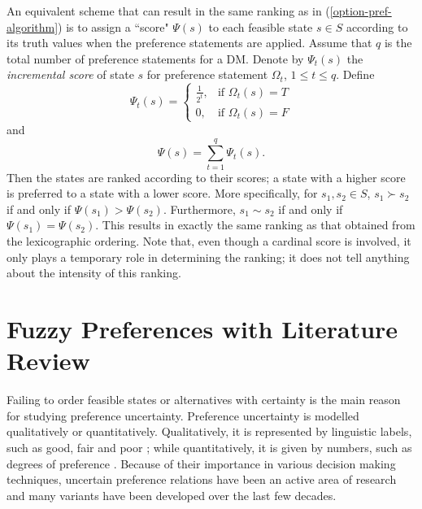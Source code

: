 An equivalent scheme that can result in the same ranking as in (\ref{option-pref-algorithm}) is to assign a ``score" $\Psi(s)$ to each feasible state $s \in S$ according to its truth values when the preference statements are applied. Assume that $q$ is the total number of preference statements for a DM. Denote by $\Psi_t(s)$ the \emph{incremental score} of state $s$ for preference statement $\Omega_t$, $1 \leq t \leq q$. Define
$$\Psi_t(s)=\left\{ \begin{array}{ll}
 \frac{1}{2^t}, & \text{if } \Omega_t(s)=T \\
 0, & \text{if } \Omega_t(s)=F
 \end{array}
 \right.$$
and
\begin{equation}\label{crisp-score}
\Psi(s)=\displaystyle\sum\limits_{t=1}^q \Psi_t(s).
\end{equation}
Then the states are ranked according to their scores; a state with a higher score is preferred to a state with a lower score. More specifically, for $s_1, s_2\in S$, $s_1\succ s_2$ if and only if $\Psi(s_1)>\Psi(s_2)$. Furthermore, $s_1\sim s_2$ if and only if $\Psi(s_1)=\Psi(s_2)$. This results in exactly the same ranking as that obtained from the lexicographic ordering. Note that, even though a cardinal score is involved, it only plays a temporary role in determining the ranking; it does not tell anything about the intensity of this ranking.

\section{Fuzzy Preferences with Literature Review}

Failing to order feasible states or alternatives with certainty is the main reason for studying preference uncertainty. Preference uncertainty is modelled qualitatively or quantitatively. Qualitatively, it is represented by linguistic labels, such as good, fair and poor \citep{Herrera&Herrera-Viedma2000, Xu2004a}; while quantitatively, it is given by numbers, such as degrees of preference \citep{Orlovsky1978, Xu2007}. Because of their importance in various decision making techniques, uncertain preference relations have been an active area of research and many variants have been developed over the last few decades.

